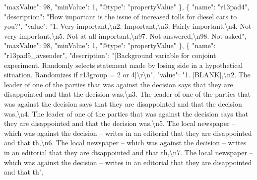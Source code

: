 \documentclass[
]{book}
\newenvironment{Shaded}{\begin{snugshade}}{\end{snugshade}}
\newcommand{\CharTok}[1]{\textcolor[rgb]{0.31,0.60,0.02}{#1}}
\newcommand{\DataTypeTok}[1]{\textcolor[rgb]{0.13,0.29,0.53}{#1}}
\newcommand{\DecValTok}[1]{\textcolor[rgb]{0.00,0.00,0.81}{#1}}
\newcommand{\FunctionTok}[1]{\textcolor[rgb]{0.00,0.00,0.00}{#1}}
\newcommand{\OtherTok}[1]{\textcolor[rgb]{0.56,0.35,0.01}{#1}}
\newcommand{\StringTok}[1]{\textcolor[rgb]{0.31,0.60,0.02}{#1}}
\begin{document}
\begin{Shaded}
\begin{Highlighting}[]
      \DataTypeTok{"maxValue"}\FunctionTok{:} \DecValTok{98}\FunctionTok{,}
      \DataTypeTok{"minValue"}\FunctionTok{:} \DecValTok{1}\FunctionTok{,}
      \DataTypeTok{"@type"}\FunctionTok{:} \StringTok{"propertyValue"}
    \FunctionTok{\}}\OtherTok{,}
    \FunctionTok{\{}
      \DataTypeTok{"name"}\FunctionTok{:} \StringTok{"r13pad4"}\FunctionTok{,}
      \DataTypeTok{"description"}\FunctionTok{:} \StringTok{"How important is the issue of increased tolls for diesel cars to you?"}\FunctionTok{,}
      \DataTypeTok{"value"}\FunctionTok{:} \StringTok{"1. Very important,}\CharTok{\textbackslash{}n}\StringTok{2. Important,}\CharTok{\textbackslash{}n}\StringTok{3. Fairly important,}\CharTok{\textbackslash{}n}\StringTok{4. Not very important,}\CharTok{\textbackslash{}n}\StringTok{5. Not at all important,}\CharTok{\textbackslash{}n}\StringTok{97. Not answered,}\CharTok{\textbackslash{}n}\StringTok{98. Not asked"}\FunctionTok{,}
      \DataTypeTok{"maxValue"}\FunctionTok{:} \DecValTok{98}\FunctionTok{,}
      \DataTypeTok{"minValue"}\FunctionTok{:} \DecValTok{1}\FunctionTok{,}
      \DataTypeTok{"@type"}\FunctionTok{:} \StringTok{"propertyValue"}
    \FunctionTok{\}}\OtherTok{,}
    \FunctionTok{\{}
      \DataTypeTok{"name"}\FunctionTok{:} \StringTok{"r13pad5_avsender"}\FunctionTok{,}
      \DataTypeTok{"description"}\FunctionTok{:} \StringTok{"[Background variable for conjoint experiment. Randomly selects statement made by losing side in a hypothetical situation. Randomizes if r13group = 2 or 4]}\CharTok{\textbackslash{}r\textbackslash{}n}\StringTok{"}\FunctionTok{,}
      \DataTypeTok{"value"}\FunctionTok{:} \StringTok{"1. [BLANK],}\CharTok{\textbackslash{}n}\StringTok{2. The leader of one of the parties that was against the decision says that they are disappointed and that the decision was,}\CharTok{\textbackslash{}n}\StringTok{3. The leader of one of the parties that was against the decision says that they are disappointed and that the decision was,}\CharTok{\textbackslash{}n}\StringTok{4. The leader of one of the parties that was against the decision says that they are disappointed and that the decision was,}\CharTok{\textbackslash{}n}\StringTok{5. The local newspaper – which was against the decision – writes in an editorial that they are disappointed and that th,}\CharTok{\textbackslash{}n}\StringTok{6. The local newspaper – which was against the decision – writes in an editorial that they are disappointed and that th,}\CharTok{\textbackslash{}n}\StringTok{7. The local newspaper – which was against the decision – writes in an editorial that they are disappointed and that th"}\FunctionTok{,}

\end{Highlighting}
\end{Shaded}
\end{document}
